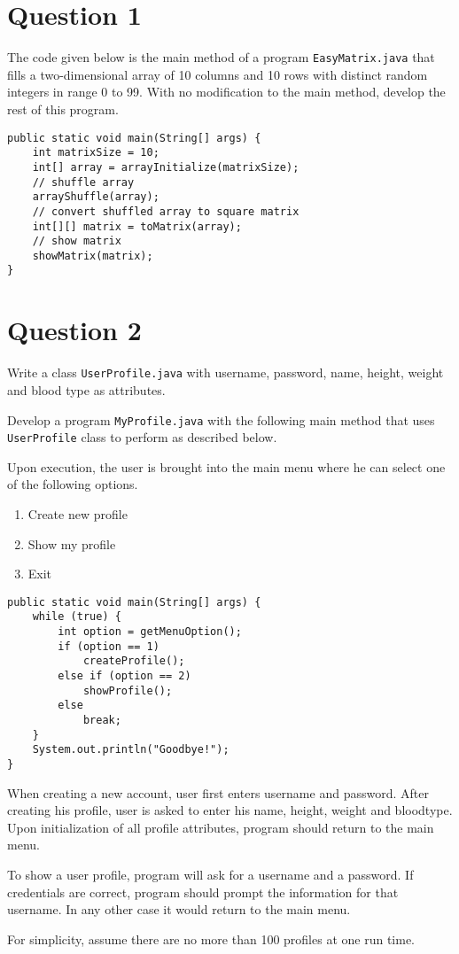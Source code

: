 \section*{Question 1}

The code given below is the main method of a program \texttt{EasyMatrix.java} that fills a two-dimensional array of 10 columns and 10 rows with distinct random integers in range 0 to 99. With no modification to the main method, develop the rest of this program.

\lstset{language=java}
\begin{lstlisting}
public static void main(String[] args) {
	int matrixSize = 10;
	int[] array = arrayInitialize(matrixSize);
	// shuffle array
	arrayShuffle(array);
	// convert shuffled array to square matrix
	int[][] matrix = toMatrix(array);
	// show matrix
	showMatrix(matrix);
}
\end{lstlisting}
\section*{Question 2}
Write a class \texttt{UserProfile.java} with username, password, name, height, weight and blood type as attributes.

Develop a program \texttt{MyProfile.java} with the following main method that uses \texttt{UserProfile} class to perform as described below.

Upon execution, the user is brought into the main menu where he can select one of the following options.
\begin{enumerate}[itemsep=0pt]
\parskip=0pt \parsep=0pt
\item Create new profile
\item Show my profile
\item Exit
\end{enumerate}

\lstset{language=java}
\begin{lstlisting}
public static void main(String[] args) {
	while (true) {
		int option = getMenuOption();
		if (option == 1)
			createProfile();
		else if (option == 2)
			showProfile();
		else
			break;
	}
	System.out.println("Goodbye!");
}
\end{lstlisting}

When creating a new account, user first enters username and password. After creating his profile, user is asked to enter his name, height, weight and bloodtype. Upon initialization of all profile attributes, program should return to the main menu.

To show a user profile, program will ask for a username and a password. If credentials are correct, program should prompt the information for that username. In any other case it would return to the main menu.

For simplicity, assume there are no more than 100 profiles at one run time.